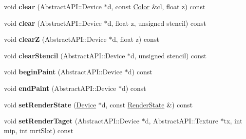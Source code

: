 \begin{DoxyCompactItemize}
\item 
\hypertarget{class_tempest_1_1_opengl2x_ac420d72c9589796b2d64edb14475b3a1}{void {\bfseries clear} (Abstract\+A\+P\+I\+::\+Device $\ast$d, const \hyperlink{class_tempest_1_1_color}{Color} \&cl, float z) const }\label{class_tempest_1_1_opengl2x_ac420d72c9589796b2d64edb14475b3a1}

\item 
\hypertarget{class_tempest_1_1_opengl2x_a66fdc55ebe93631248c801905db423d1}{void {\bfseries clear} (Abstract\+A\+P\+I\+::\+Device $\ast$d, float z, unsigned stencil) const }\label{class_tempest_1_1_opengl2x_a66fdc55ebe93631248c801905db423d1}

\item 
\hypertarget{class_tempest_1_1_opengl2x_a50ead43b774de766d2388301e68b0884}{void {\bfseries clear\+Z} (Abstract\+A\+P\+I\+::\+Device $\ast$d, float z) const }\label{class_tempest_1_1_opengl2x_a50ead43b774de766d2388301e68b0884}

\item 
\hypertarget{class_tempest_1_1_opengl2x_a54854cb3d08884680ed3aaf4a7a0e7f3}{void {\bfseries clear\+Stencil} (Abstract\+A\+P\+I\+::\+Device $\ast$d, unsigned stencil) const }\label{class_tempest_1_1_opengl2x_a54854cb3d08884680ed3aaf4a7a0e7f3}

\item 
\hypertarget{class_tempest_1_1_opengl2x_a08fdaf1c11f42dc1200cb91505474510}{void {\bfseries begin\+Paint} (Abstract\+A\+P\+I\+::\+Device $\ast$d) const }\label{class_tempest_1_1_opengl2x_a08fdaf1c11f42dc1200cb91505474510}

\item 
\hypertarget{class_tempest_1_1_opengl2x_a0aa845a49200c9502c06e32be8a21a84}{void {\bfseries end\+Paint} (Abstract\+A\+P\+I\+::\+Device $\ast$d) const }\label{class_tempest_1_1_opengl2x_a0aa845a49200c9502c06e32be8a21a84}

\item 
\hypertarget{class_tempest_1_1_opengl2x_a595b512f8f332d8f043bf79438db66b6}{void {\bfseries set\+Render\+State} (\hyperlink{struct_tempest_1_1_opengl2x_1_1_device}{Device} $\ast$d, const \hyperlink{class_tempest_1_1_render_state}{Render\+State} \&) const }\label{class_tempest_1_1_opengl2x_a595b512f8f332d8f043bf79438db66b6}

\item 
\hypertarget{class_tempest_1_1_opengl2x_a76416f605848c6dbf9663fa7aa7965c5}{void {\bfseries set\+Render\+Taget} (Abstract\+A\+P\+I\+::\+Device $\ast$d, Abstract\+A\+P\+I\+::\+Texture $\ast$tx, int mip, int mrt\+Slot) const }\label{class_tempest_1_1_opengl2x_a76416f605848c6dbf9663fa7aa7965c5}


\end{DoxyCompactItemize}
